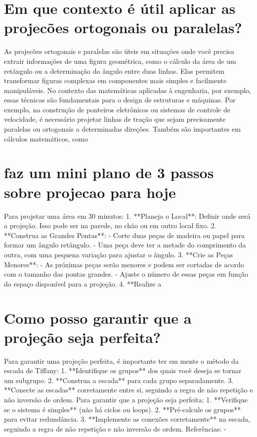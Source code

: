 \documentclass[11pt,a4paper]{article}
\begin{document}
\section{Em que contexto é útil aplicar as projecões ortogonais ou paralelas?}
As projecões ortogonais e paralelas são úteis em situações onde você precisa extrair informações de uma figura geométrica, como o cálculo da área de um retângulo ou a determinação do ângulo entre duas linhas. Elas permitem transformar figuras complexas em componentes mais simples e facilmente manipuláveis. No contexto das matemáticas aplicadas à engenharia, por exemplo, essas técnicas são fundamentais para o design de estruturas e máquinas. Por exemplo, na construção de ponteiros eletrônicos ou sistemas de controle de velocidade, é necessário projetar linhas de tração que sejam precisamente paralelas ou ortogonais a determinadas direções. Também são importantes em cálculos matemáticos, como

\section{faz um mini plano de 3 passos sobre projecao para hoje}
Para projetar uma área em 30 minutos: 1. **Planeja o Local**: Definir onde será a projeção. Isso pode ser na parede, no chão ou em outro local fixo. 2. **Construa as Grandes Pontas**: - Corte duas peças de madeira ou papel para formar um ângulo retângulo. - Uma peça deve ter a metade do comprimento da outra, com uma pequena variação para ajustar o ângulo. 3. **Crie as Peças Menores**: - As próximas peças serão menores e podem ser cortadas de acordo com o tamanho das pontas grandes. - Ajuste o número de essas peças em função do espaço disponível para a projeção. 4. **Realize a

\section{Como posso garantir que a projeção seja perfeita?}
Para garantir uma projeção perfeita, é importante ter em mente o método da escada de Tiffany: 1. **Identifique os grupos** dos quais você deseja se tornar um subgrupo. 2. **Construa a escada** para cada grupo separadamente. 3. **Conecte as escadas** corretamente entre si, seguindo a regra de não repetição e não inversão de ordem. Para garantir que a projeção seja perfeita: 1. **Verifique se o sistema é simples** (não há ciclos ou loops). 2. **Pré-calcule os grupos** para evitar redundância. 3. **Implemente as conexões corretamente** na escada, seguindo a regra de não repetição e não inversão de ordem. Referências: -
\end{document}
